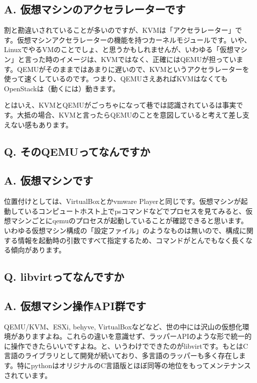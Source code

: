 \documentclass[9pt,b5paper,tombo,openany]{jsbook}
\begin{document}
\subsection*{{\LARGE\bfseries A.} 仮想マシンのアクセラレーターです}
割と勘違いされていることが多いのですが、KVMは「アクセラレーター」です。仮想マシンアクセラレーターの機能を持つカーネルモジュールです。いや、LinuxでやるVMのことでしょ、と思うかもしれませんが、いわゆる「仮想マシン」と言った時のイメージは、KVMではなく、正確にはQEMUが担っています。QEMUがそのままではあまりに遅いので、KVMというアクセラレーターを使って速くしているのです。つまり、QEMUさえあればKVMはなくてもOpenStackは（動くには）動きます。

とはいえ、KVMとQEMUがごっちゃになって巷では認識されているは事実です。大抵の場合、KVMと言ったらQEMUのことを意図していると考えて差し支えない感もあります。\\

\subsection*{{\LARGE\bfseries Q.} そのQEMUってなんですか}
\subsection*{{\LARGE\bfseries A.} 仮想マシンです}
位置付けとしては、VirtualBoxとかvmware Playerと同じです。仮想マシンが起動しているコンピュートホスト上でpsコマンドなどでプロセスを見てみると、仮想マシンごとにqemuのプロセスが起動していることが確認できると思います。いわゆる仮想マシン構成の「設定ファイル」のようなものは無いので、構成に関する情報を起動時の引数ですべて指定するため、コマンドがとんでもなく長くなる傾向があります。

\subsection*{{\LARGE\bfseries Q.} libvirtってなんですか}
\subsection*{{\LARGE\bfseries A.} 仮想マシン操作API群です}
QEMU/KVM、ESXi, behyve, VirtualBoxなどなど、世の中には沢山の仮想化環境がありますよね。これらの違いを意識せず、ラッパーAPIのような形で統一的に操作できたらいいですよね。と、いうわけでできたのがlibvirtです。もとはC言語のライブラリとして開発が続いており、多言語のラッパーも多く存在します。特にpythonはオリジナルのC言語版とほぼ同等の地位をもってメンテナンスされています。
\end{document}
